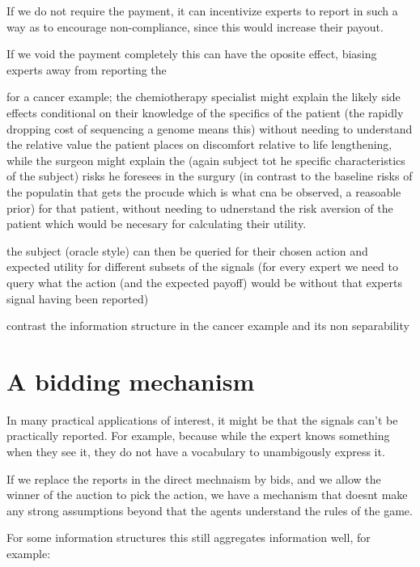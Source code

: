 If we do not require the payment, it can incentivize experts to report in such a way as to encourage non-compliance, since this would increase their payout. 


If we void the payment completely this can have the oposite effect, biasing experts away from reporting the 


for a cancer example; the chemiotherapy specialist might explain the likely side effects conditional on their knowledge of the specifics of the patient (the rapidly dropping cost of sequencing a genome means this) without needing to understand the relative value the patient places on discomfort relative to life lengthening, while the surgeon might explain the (again subject tot he specific characteristics of the subject) risks he foresees in the surgury (in contrast to the baseline risks of the populatin that gets the procude which is what cna be observed, a reasoable prior) for that patient, without needing to udnerstand the risk aversion of the patient which would be necesary for calculating their utility.

the subject (oracle style) can then be queried for their chosen action and expected utility for different subsets of the signals (for every expert we need to query what the action (and the expected payoff) would be without that experts signal having been reported)

contrast the information structure in the cancer example and its non separability 


\section{A bidding mechanism }

In many practical applications of interest, it might be that the signals can't be practically reported. For example, because while the expert knows something when they see it, they do not have a vocabulary to unambigously express it. 


If we replace the reports in the direct mechnaism by bids, and we allow the winner of the auction to pick the action, we have a mechanism that doesnt make any strong assumptions beyond that the agents understand the rules of the game.

For some information structures this still aggregates information well, for example:

